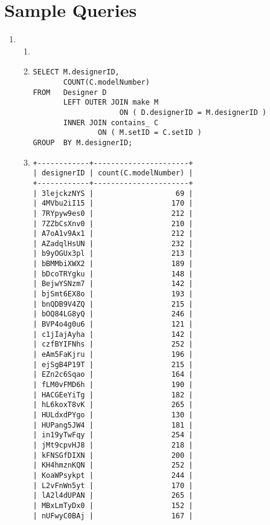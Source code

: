 \documentclass[american,extrafontsizes,12pt,portrait,letterpaper,oneside,onecolumn,article,final]{memoir}
\begin{document}
\section*{Sample Queries}
%
\begin{enumerate}[leftmargin=*,label={\strong{\uline{(\emph{\Alph*})}}}]

\item
\begin{enumerate}[leftmargin=*,widest={\strong{Explanation:}}]
\item[\strong{Intent:}] 
\item[\strong{Query:}]
\begin{verbatim}
SELECT M.designerID,
       COUNT(C.modelNumber)
FROM   Designer D
       LEFT OUTER JOIN make M
                    ON ( D.designerID = M.designerID )
       INNER JOIN contains_ C
               ON ( M.setID = C.setID )
GROUP  BY M.designerID;
\end{verbatim}
\item[\strong{Result:}]
\begin{verbatim}
+------------+----------------------+
| designerID | count(C.modelNumber) |
+------------+----------------------+
| 3lejckzNYS |                   69 |
| 4MVbu2iI15 |                  170 |
| 7RYpyw9es0 |                  212 |
| 7ZZbCsXnv0 |                  210 |
| A7oA1v9Ax1 |                  212 |
| AZadqlHsUN |                  232 |
| b9yOGUx3pl |                  213 |
| bBMMbiXWX2 |                  189 |
| bDcoTRYgku |                  148 |
| BejwYSNzm7 |                  142 |
| bjSmt6EX8o |                  193 |
| bnQDB9V4ZQ |                  215 |
| bOQ84LG8yQ |                  246 |
| BVP4o4g0u6 |                  121 |
| c1jIajAyha |                  142 |
| czfBYIFNhs |                  252 |
| eAm5FaKjru |                  196 |
| ejSgB4P19T |                  215 |
| EZn2c6Sqao |                  164 |
| fLM0vFMD6h |                  190 |
| HACGEeYiTg |                  182 |
| hL6koxT8vK |                  265 |
| HULdxdPYgo |                  130 |
| HUPang5JW4 |                  181 |
| in19yTwFqy |                  254 |
| jMt9cpvHJ8 |                  218 |
| kFNSGfDIXN |                  200 |
| KH4hmznKQN |                  252 |
| KoaWPsykpt |                  244 |
| L2vFnWn5yt |                  170 |
| lA2l4dUPAN |                  265 |
| MBxLmTyDx0 |                  152 |
| nUFwyC0BAj |                  167 |

\end{verbatim}
\end{enumerate}
\end{enumerate}
\end{document}
